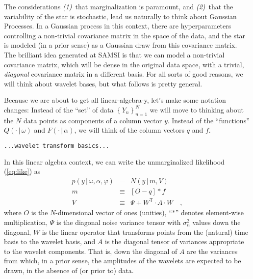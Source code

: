 \documentclass[12pt,letterpaper]{article}
\newcommand{\warning}[1]{\texttt{#1}}
\newcommand{\given}{\,|\,}
\newcommand{\setof}[1]{\left\{{#1}\right\}}
\newcommand{\transpose}[1]{{#1}^{\mathsf{T}}}
\newcommand{\elmult}{\ast}
\newcommand{\datum}{Y}
\newcommand{\data}{\setof{\datum_n}_{n=1}^N}
\newcommand{\datavec}{y}
\newcommand{\exofn}{Q}
\newcommand{\exovec}{q}
\newcommand{\exopars}{\omega}
\newcommand{\flux}{F}
\newcommand{\fluxvec}{f}
\newcommand{\starpars}{\alpha}
\newcommand{\variance}{\sigma^2}
\newcommand{\hyperpars}{\varphi}
\newcommand{\normal}{N}
\newcommand{\meanvec}{m}
\newcommand{\noisetensor}{\Psi}
\newcommand{\wavetensor}{A}
\newcommand{\weightmatrix}{W}
\newcommand{\vartensor}{V}
\newcommand{\onevec}{O}
\begin{document}
The considerations \textsl{(1)}~that marginalization is paramount,
and \textsl{(2)}~that the variability of the star is stochastic,
lead us naturally to think about Gaussian Processes.
In a Gaussian process in this context,
there are hyperparameters controlling a non-trivial covariance matrix in the space of the data,
and the star is modeled (in a prior sense) as a Gaussian draw from this covariance matrix.
The brilliant idea generated at SAMSI is that we can model a non-trivial covariance matrix,
which will be dense in the original data space,
with a trivial, \emph{diagonal} covariance matrix in a different basis.
For all sorts of good reasons, we will think about wavelet bases,
but what follows is pretty general.

Because we are about to get all linear-algebra-y, let's make some
notation changes: Instead of the ``set'' of data $\data$ we will move
to thinking about the $N$ data points as components of a column vector
$\datavec$.  Instead of the ``functions''
$\exofn(\cdot\given\exopars)$ and $\flux(\cdot\given\starpars)$, we
will think of the column vectors $\exovec$ and $\fluxvec$.

\warning{...wavelet transform basics...}

In this linear algebra context, we can write the unmarginalized likelihood (\ref{eq:like}) as
\begin{eqnarray}
p(\datavec\given\exopars,\starpars,\hyperpars)
  &=& \normal(\datavec\given\meanvec,\vartensor)
\\
\meanvec
  &\equiv& [\onevec - \exovec]\elmult\fluxvec
\\
\vartensor
  &\equiv& \noisetensor + \transpose{\weightmatrix}\cdot\wavetensor\cdot\weightmatrix
\quad ,
\end{eqnarray}
where
$\onevec$ is the $N$-dimensional vector of ones (unities),
``$\elmult$'' denotes element-wise multiplication,
$\noisetensor$ is the diagonal noise variance tensor with $\variance_n$ values down the diagonal,
$\weightmatrix$ is the linear operator that transforms points
from the (natural) time basis to the wavelet basis,
and $\wavetensor$ is the diagonal tensor of variances appropriate to the wavelet components.
That is, down the diagonal of $\wavetensor$ are the variances from which,
in a prior sense,
the amplitudes of the wavelets are expected to be drawn,
in the absence of (or prior to) data.
\end{document}
